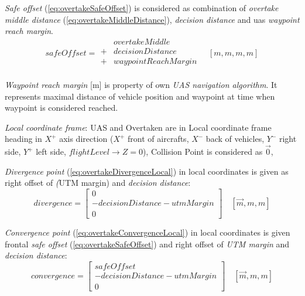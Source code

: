     \noindent \emph{Safe offset} (\ref{eq:overtakeSafeOffset}) is considered as combination of \emph{overtake middle distance} (\ref{eq:overtakeMiddleDistance}), \emph{decision distance} and uas \emph{waypoint reach margin}.
    \begin{equation}\label{eq:overtakeSafeOffset}
        safeOffset= \begin{aligned}
                        &  overtakeMiddle \\
                        +& decisionDistance \\
                        +& waypointReachMargin\\
                    \end{aligned}
                    \quad [m,m,m,m]
    \end{equation}
    
    \begin{note}
        \emph{Waypoint reach margin} [m] is property of own \emph{UAS navigation algorithm}. It represents maximal distance of vehicle position and waypoint at time when waypoint is considered reached. 
    \end{note}
    
    \noindent \emph{Local coordinate frame}: UAS and Overtaken are in Local coordinate frame heading in $X^+$ axis direction ($X^+$ front of aircrafts, $X^-$ back of vehicles, $Y^-$ right side, $Y^+$ left side, $flightLevel\to Z=0$), Collision Point is considered as $\vec{0}$,
    
    \emph{Divergence point} (\ref{eq:overtakeDivergenceLocal}) in local coordinates is given as right offset of \emph(UTM margin) and \emph{decision distance}:
    \begin{equation}\label{eq:overtakeDivergenceLocal}
        divergence= 
        \begin{bmatrix}
            0\\
            -decisionDistance - utmMargin\\
            0
        \end{bmatrix}
        \quad [\vec{m},m,m]
    \end{equation}
    
    \emph{Convergence point} (\ref{eq:overtakeConvergenceLocal}) in local coordinates is given frontal \emph{safe offset} (\ref{eq:overtakeSafeOffset}) and right offset of \emph{UTM margin} and \emph{decision distance}:
    \begin{equation}\label{eq:overtakeConvergenceLocal}
        convergence= 
        \begin{bmatrix}
            safeOffset\\
            -decisionDistance - utmMargin\\
            0
        \end{bmatrix}
        \quad [\vec{m},m,m]
    \end{equation}
    
